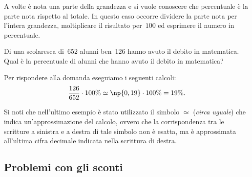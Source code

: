 A volte è nota una parte della grandezza e si vuole conoscere che percentuale è
la parte nota rispetto al totale. In questo caso occorre dividere la parte nota per l'intera grandezza,
moltiplicare il risultato per~$100$ ed esprimere il numero in percentuale.

\begin{exrig}
\begin{esempio}
Di una scolaresca di~$652$ alunni ben~$126$ hanno avuto il debito in matematica.
Qual è la percentuale di alunni che hanno avuto il debito in matematica?

Per rispondere alla domanda eseguiamo i seguenti calcoli:
\[\frac{126}{652}\cdot100\%\simeq\np{0,19}\cdot100\%=19\%.\]
\end{esempio}
\end{exrig}

Si noti che nell'ultimo esempio è stato utilizzato il simbolo $\simeq$ (\emph{circa uguale}) che indica un'approssimazione del calcolo, ovvero che la corrispondenza tra le scritture a sinistra e a destra di tale simbolo non è esatta, ma è approssimata all'ultima cifra decimale indicata nella scrittura di destra.

\subsection{Problemi con gli sconti}

